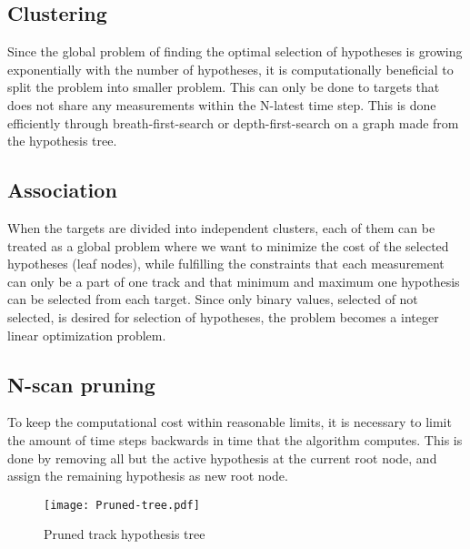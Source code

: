 \subsection{Clustering}
Since the global problem of finding the optimal selection of hypotheses is growing exponentially with the number of hypotheses, it is computationally beneficial to split the problem into smaller problem. This can only be done to targets that does not share any measurements within the N-latest time step. This is done efficiently through breath-first-search or depth-first-search on a graph made from the hypothesis tree.

\subsection{Association}
When the targets are divided into independent clusters, each of them can be treated as a global problem where we want to minimize the cost of the selected hypotheses (leaf nodes), while fulfilling the constraints that each measurement can only be a part of one track and that minimum and maximum one hypothesis can be selected from each target. Since only binary values, selected of not selected, is desired for selection of hypotheses, the problem becomes a integer linear optimization problem.

\subsection{N-scan pruning}
To keep the computational cost within reasonable limits, it is necessary to limit the amount of time steps backwards in time that the algorithm computes. This is done by removing all but the active hypothesis at the current root node, and assign the remaining hypothesis as new root node. 

\begin{figure}[ht]
\centering
\texttt{[image: Pruned-tree.pdf]}
\caption{Pruned track hypothesis tree}
\label{fig:pruned-hyp-tree}
\end{figure}